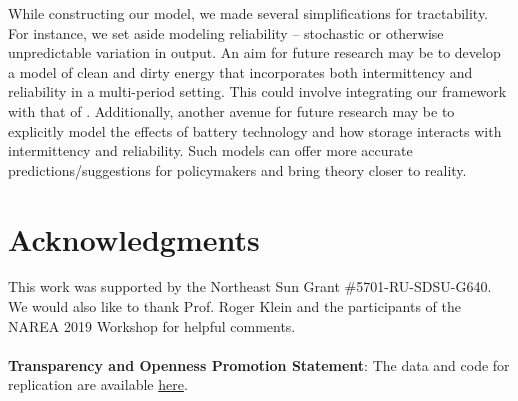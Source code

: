 \documentclass[11pt,a4paper,leqno]{extarticle}
\begin{document}
	While constructing our model, we made several simplifications for tractability. For instance, we set aside modeling reliability -- stochastic or otherwise unpredictable variation in output. An aim for future research may be to develop a model of clean and dirty energy that incorporates both intermittency and reliability in a multi-period setting. This could involve integrating our framework with that of \citet{HH}. Additionally, another avenue for future research may be to explicitly model the effects of battery technology and how storage interacts with intermittency and reliability. Such models can offer more accurate predictions/suggestions for policymakers and bring theory closer to reality.
	
	\section{Acknowledgments}
	
	This work was supported by the Northeast Sun Grant \#5701-RU-SDSU-G640. We would also like to thank Prof. Roger Klein and the participants of the NAREA 2019 Workshop for helpful comments.\\\\
	\noindent
	\textbf{Transparency and Openness Promotion Statement}: The data and code for replication are available \href{https://github.com/SA3291/Energy-Intermittency-Paper.git}{here}. 
	
	
	
\end{document}

